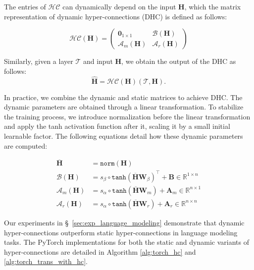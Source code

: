 \documentclass{article} %
\begin{document}
The entries of $\mathcal{HC}$ can dynamically depend on the input $\mathbf{H}$, which the matrix representation of dynamic hyper-connections (DHC) is defined as follows:

\begin{equation}
\mathcal{HC}(\mathbf{H}) = \begin{pmatrix}
\mathbf{0}_{1\times 1} & \mathcal{B}(\mathbf{H}) \\
\mathcal{A}_m(\mathbf{H}) & \mathcal{A}_r(\mathbf{H})
\end{pmatrix}
\end{equation}

Similarly, given a layer \(\mathcal{T}\) and input \(\mathbf{H}\), we obtain the output of the DHC as follows:
\begin{equation}
\mathbf{\hat{H}} = \mathcal{HC}(\mathbf H)(\mathcal{T}, \mathbf H).
\end{equation}

In practice, we combine the dynamic and static matrices to achieve DHC. The dynamic parameters are obtained through a linear transformation. To stabilize the training process, we introduce normalization before the linear transformation and apply the tanh activation function after it, scaling it by a small initial learnable factor. 
The following equations detail how these dynamic parameters are computed:

\begin{align}
\label{eq:norm}
\overline{\mathbf{H}} &= \texttt{norm}(\mathbf{H}) \\
\label{eq:B}
\mathcal{B}(\mathbf{H})     &= 
s_\beta \circ \texttt{tanh} (\overline{\mathbf{H}} \mathbf{W}_{\beta})^\intercal + \mathbf{B} \in \mathbb{R}^{1\times n}\\
\label{eq:Am}
\mathcal{A}_{m}(\mathbf{H}) &= 
s_\alpha \circ \texttt{tanh} (\overline{\mathbf{H}} \mathbf{W}_{m}) + \mathbf{A}_m \in \mathbb{R}^{n\times 1} \\
\label{eq:Ar}
\mathcal{A}_{r}(\mathbf{H})     &= 
s_\alpha \circ \texttt{tanh} (\overline{\mathbf{H}} \mathbf{W}_{r}) + \mathbf{A}_r \in \mathbb{R}^{n\times n} 
\end{align}


Our experiments in \S~\ref{sec:exp_language_modeling} demonstrate that dynamic hyper-connections outperform static hyper-connections in language modeling tasks. 
The PyTorch implementations for both the static and dynamic variants of hyper-connections are detailed in Algorithm \ref{alg:torch_hc} and \ref{alg:torch_trans_with_hc}.
\end{document}
